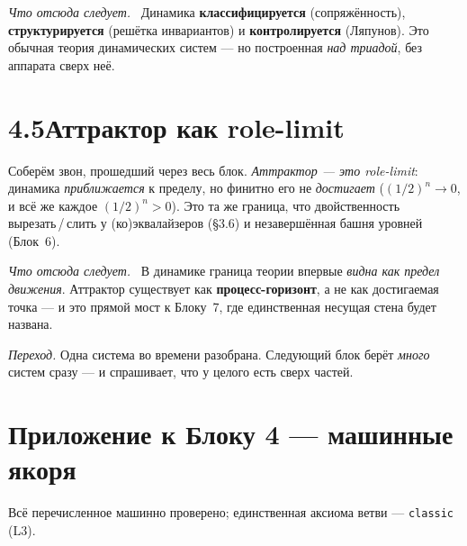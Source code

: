 \documentclass[12pt,a4paper]{article}
\newcommand{\rezultat}{\medskip\noindent\emph{Что отсюда следует.}\ }
\begin{document}
\rezultat
Динамика \textbf{классифицируется} (сопряжённость), \textbf{структурируется} (решётка инвариантов) и
\textbf{контролируется} (Ляпунов). Это обычная теория динамических систем --- но построенная
\emph{над триадой}, без аппарата сверх неё.

\section*{4.5\quad Аттрактор как role-limit}

Соберём звон, прошедший через весь блок. \emph{Аттрактор --- это role-limit}: динамика
\emph{приближается} к пределу, но финитно его не \emph{достигает} ($(1/2)^n \to 0$, и всё же каждое
$(1/2)^n > 0$). Это та же граница, что двойственность вырезать\,/\,слить у (ко)эквалайзеров (§3.6) и
незавершённая башня уровней (Блок~6).

\rezultat
В динамике граница теории впервые \emph{видна как предел движения}. Аттрактор существует как
\textbf{процесс-горизонт}, а не как достигаемая точка --- и это прямой мост к Блоку~7, где единственная
несущая стена будет названа.

\medskip
\noindent\emph{Переход.} Одна система во времени разобрана. Следующий блок берёт \emph{много} систем
сразу --- и спрашивает, что у целого есть сверх частей.

\appendix
\section*{Приложение к Блоку 4 — машинные якоря}
\small\raggedright\sloppy
\noindent Всё перечисленное машинно проверено; единственная аксиома ветви --- \texttt{classic} (L3).
\end{document}
